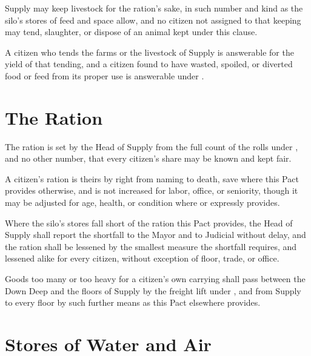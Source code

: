 \begin{clauses}
\item Supply may keep livestock for the ration's sake, in such number and kind as the silo's stores of feed and space allow, and no citizen not assigned to that keeping may tend, slaughter, or dispose of an animal kept under this clause.
\item A citizen who tends the farms or the livestock of Supply is answerable for the yield of that tending, and a citizen found to have wasted, spoiled, or diverted food or feed from its proper use is answerable under .
\end{clauses}

\section{The Ration}
\label{sec:supply:ration}

The ration is set by the Head of Supply from the full count of the rolls under , and no other number, that every citizen's share may be known and kept fair.

\begin{clauses}
\item A citizen's ration is theirs by right from naming to death, save where this Pact provides otherwise, and is not increased for labor, office, or seniority, though it may be adjusted for age, health, or condition where  or  expressly provides.
\item Where the silo's stores fall short of the ration this Pact provides, the Head of Supply shall report the shortfall to the Mayor and to Judicial without delay, and the ration shall be lessened by the smallest measure the shortfall requires, and lessened alike for every citizen, without exception of floor, trade, or office.
\item Goods too many or too heavy for a citizen's own carrying shall pass between the Down Deep and the floors of Supply by the freight lift under , and from Supply to every floor by such further means as this Pact elsewhere provides.
\end{clauses}

\section{Stores of Water and Air}
\label{sec:supply:stores-of-water-and-air}

